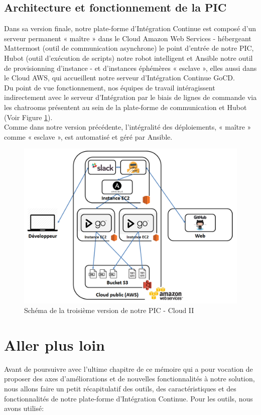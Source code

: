       \subsection{Architecture et fonctionnement de la PIC}
      Dans sa version finale, notre plate-forme d'Intégration Continue est composé d'un serveur permanent « maître » dans le Cloud Amazon Web Services - hébergeant Mattermost (outil de communication asynchrone) le point d'entrée de notre PIC, Hubot (outil d'exécution de scripts) notre robot intelligent et Ansible notre outil de provisionning d'instance - et d'instances éphémères « esclave », elles aussi dans le Cloud AWS, qui accueillent notre serveur d'Intégration Continue GoCD.\\
      Du point de vue fonctionnement, nos équipes de travail intéragissent indirectement avec le serveur d'Intégration par le biais de lignes de commande via les chatrooms présentent au sein de la plate-forme de communication et Hubot (Voir Figure \ref{PICv3}).\\
      Comme dans notre version précédente, l'intégralité des déploiements, « maître » comme « esclave », est automatisé et géré par Ansible.

      \begin{figure}
        \begin{center}
          \includegraphics[scale=0.5]{images/PICv3.png}
        \end{center}
        \caption{Schéma de la troisième version de notre PIC - Cloud II}
        \label{PICv3}
      \end{figure}

      \section{Aller plus loin}
      Avant de poursuivre avec l'ultime chapitre de ce mémoire qui a pour vocation de proposer des axes d'améliorations et de nouvelles fonctionnalités à notre solution, nous allons faire un petit récapitulatif des outils, des caractéristiques et des fonctionnalités de notre plate-forme d'Intégration Continue. Pour les outils, nous avons utilisé:\\

